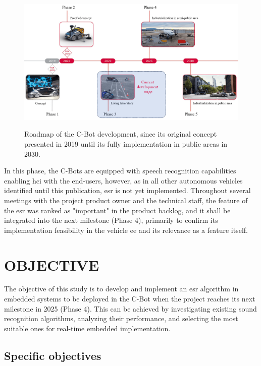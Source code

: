 \begin{figure}[htbp]
    \raggedright
        \caption{Roadmap of the C-Bot development, since its original concept presented in 2019 until its fully implementation in public areas in 2030.}
        \includegraphics[width=1\textwidth]{resources/images/020-introduction/Introduction_context_C-Bot_roadmap.png}
        \label{fig:introduction_C-Bot_roadmap}
\end{figure} 

In this phase, the C-Bots are equipped with speech recognition capabilities enabling \gls{hci} with the end-users, however, as in all other autonomous vehicles identified until this publication, \gls{esr} is not yet implemented. Throughout several meetings with the project product owner and the technical staff, the feature of the \gls{esr} was ranked as "important" in the product backlog, and it shall be integrated into the next milestone (Phase 4), primarily to confirm its implementation feasibility in the vehicle \gls{ee} and its relevance as a feature itself.


\section{OBJECTIVE}
\label{sec:introduction_objective}

The objective of this study is to develop and implement an \gls{esr} algorithm in embedded systems to be deployed in the C-Bot when the project reaches its next milestone in 2025 (Phase 4). This can be achieved by investigating existing sound recognition algorithms, analyzing their performance, and selecting the most suitable ones for real-time embedded implementation.


\subsection{Specific objectives}
\label{subsec:objectives_specifics}


